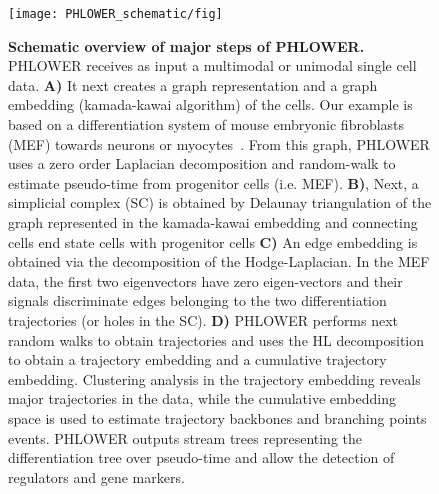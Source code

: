 \begin{figure}[!ht]
	\centering
	\texttt{[image: PHLOWER\_schematic/fig]}
	\vspace{0.1cm}
	\caption[Schematic overview of major steps of PHLOWER.]{\textbf{Schematic overview of major steps of PHLOWER.} PHLOWER receives as input a multimodal or unimodal single cell data. \textbf{A)} It next creates a graph representation and a graph embedding (kamada-kawai algorithm) of the cells. Our example is based on a differentiation system of mouse embryonic fibroblasts (MEF) towards neurons or myocytes~\citep{treutlein2016dissecting}. From this graph, PHLOWER uses a zero order Laplacian decomposition and random-walk to estimate pseudo-time from progenitor cells (i.e. MEF). \textbf{B)}, Next, a simplicial complex (SC) is obtained by Delaunay triangulation of the graph represented in the kamada-kawai embedding and connecting cells end state cells with progenitor cells \textbf{C)} An edge embedding is obtained via the decomposition of the Hodge-Laplacian. In the MEF data, the first two eigenvectors have zero eigen-vectors and their signals discriminate edges belonging to the two differentiation trajectories (or holes in the SC). \textbf{D)} PHLOWER performs next random walks to obtain trajectories and uses the HL decomposition to obtain a trajectory embedding and a cumulative trajectory embedding. Clustering analysis in the trajectory embedding reveals major trajectories in the data, while the cumulative embedding space is used to estimate trajectory backbones and branching points events. PHLOWER outputs stream trees representing the differentiation tree over pseudo-time and allow the detection of regulators and gene markers.} 
	\label{fig:PHLOWER_schematic}
\end{figure}

